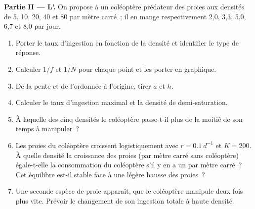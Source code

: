 \begin{problem}
\medskip
\noindent\textbf{Partie II --- L'.}
On propose à un coléoptère prédateur des proies aux densités de 5, 10,
20, 40 et 80 par mètre carré~; il en mange respectivement 2,0, 3,3,
5,0, 6,7 et 8,0 par jour.
\begin{enumerate}[resume]
  \item Porter le taux d'ingestion en fonction de la densité et
        identifier le type de réponse.
  \item Calculer $1/f$ et $1/N$ pour chaque point et les porter en
        graphique.
  \item De la pente et de l'ordonnée à l'origine, tirer $a$ et $h$.
  \item Calculer le taux d'ingestion maximal et la densité de
        demi-saturation.
  \item À laquelle des cinq densités le coléoptère passe-t-il plus de
        la moitié de son temps à manipuler~?
  \item Les proies du coléoptère croissent logistiquement avec $r = \qty{0.1}{d^{-1}}$
        et $K = 200$. À quelle densité la croissance des proies (par
        mètre carré sans coléoptère) égale-t-elle la consommation du
        coléoptère s'il y en a un par mètre carré~? Cet équilibre
        est-il stable face à une légère hausse des proies~?
  \item Une seconde espèce de proie apparaît, que le coléoptère
        manipule deux fois plus vite. Prévoir le changement de son
        ingestion totale à haute densité.
\end{enumerate}


\end{problem}
